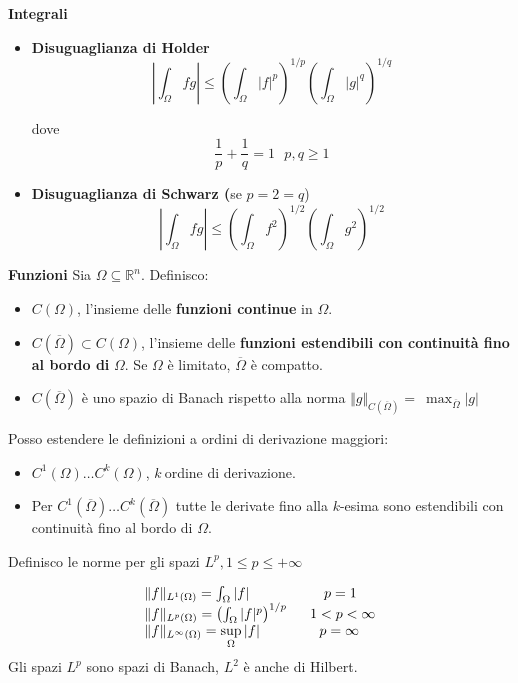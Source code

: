 \documentclass[10pt,a4paper,twoside,openright]{book}
\begin{document}
\textbf{Integrali}
\begin{itemize}
\item \textbf{Disuguaglianza di Holder}\begin{equation*}
\left| \int _{\Omega } fg\right| \leqslant \left(\int _{\Omega }| f| ^{p}\right)^{1/p}\left(\int _{\Omega }| g| ^{q}\right)^{1/q}
\end{equation*}

dove \begin{equation*}
\frac{1}{p} +\frac{1}{q} =1\ \ \ p,q\geqslant 1
\end{equation*}
\item \textbf{Disuguaglianza di Schwarz (}se $p=2=q$) \begin{equation*}
\left| \int _{\Omega } fg\right| \leqslant \left(\int _{\Omega } f^{2}\right)^{1/2}\left(\int _{\Omega } g^{2}\right)^{1/2}
\end{equation*}
\end{itemize}

\textbf{Funzioni}
Sia $\Omega \subseteq \mathbb{R}^{n}$. Definisco:
\begin{itemize}
	\item $C(\Omega)$, l'insieme delle \textbf{funzioni continue} in $\Omega $.
	\item $C(\overline{\Omega }) \subset C(\Omega)$, l'insieme delle \textbf{funzioni estendibili con continuità fino al bordo di} $\Omega $. Se $\Omega $ è limitato, $\overline{\Omega }$ è compatto. 
	\item $C(\overline{\Omega })$ è uno spazio di Banach rispetto alla norma $\Vert g\Vert _{C(\overline{\Omega })} =\ \max_{\overline{\Omega }}| g| $
\end{itemize}

Posso estendere le definizioni a ordini di derivazione maggiori:
\begin{itemize}
	\item $C^{1}(\Omega) \dotsc C^{k}(\Omega)$, $\displaystyle k\ $ordine di derivazione.
	\item Per $C^{1}(\overline{\Omega }) \dotsc C^{k}(\overline{\Omega })$ tutte le derivate fino alla $\displaystyle k$-esima sono estendibili con continuità fino al bordo di $\displaystyle \Omega $.
\end{itemize}

Definisco le norme per gli spazi $L^{p},1\leqslant p\leqslant +\infty $

\begin{equation*}
\begin{array}{ l l }
\Vert f\Vert _{L^{1}(\Omega)} =\int _{\Omega }| f|  & \ \ \ \ p=1\\
\Vert f\Vert _{L^{p}(\Omega)} =\left(\int _{\Omega }| f| ^{p}\right)^{1/p} \  & \ 1< p< \infty \\
\Vert f\Vert _{L^{\infty }(\Omega)} =\sup\limits _{\Omega }| f|  & \ \ \ p=\infty 
\end{array}
\end{equation*}
Gli spazi $\displaystyle L^{p}$ sono spazi di Banach, $\displaystyle L^{2}$ è anche di Hilbert.
\end{document}

